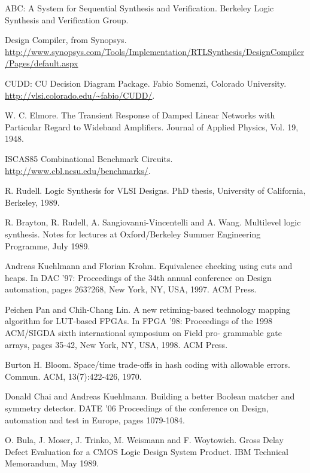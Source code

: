 \documentclass{tfg}
\begin{document}
\begin{thebibliography}{9}

ABC: A System for Sequential Synthesis and Verification. Berkeley Logic Synthesis and Verification Group.
 
Design Compiler, from Synopsys. \url{http://www.synopsys.com/Tools/Implementation/RTLSynthesis/DesignCompiler/Pages/default.aspx}

CUDD: CU Decision Diagram Package. Fabio Somenzi, Colorado University. \url{http://vlsi.colorado.edu/~fabio/CUDD/}.

W. C. Elmore. The Transient Response of Damped Linear Networks with Particular Regard to Wideband Amplifiers. Journal of Applied Physics, Vol. 19, 1948.

ISCAS85 Combinational Benchmark Circuits. \url{http://www.cbl.ncsu.edu/benchmarks/}.

R. Rudell. Logic Synthesis for VLSI Designs. PhD thesis, University of California, Berkeley, 1989.

R. Brayton, R. Rudell, A. Sangiovanni-Vincentelli and A. Wang. Multilevel logic synthesis. Notes for lectures at Oxford/Berkeley Summer Engineering Programme, July 1989.

Andreas Kuehlmann and Florian Krohm. Equivalence checking using
cuts and heaps. In DAC '97: Proceedings of the 34th annual conference
 on Design automation, pages 263?268, New York, NY, USA, 1997. ACM
  Press.

Peichen Pan and Chih-Chang Lin. A new retiming-based technology
mapping algorithm for LUT-based FPGAs. In FPGA '98: Proceedings
 of the 1998 ACM/SIGDA sixth international symposium on Field pro-
grammable gate arrays, pages 35-42, New York, NY, USA, 1998. ACM
 Press.
 
Burton H. Bloom. Space/time trade-offs in hash coding with allowable
errors. Commun. ACM, 13(7):422-426, 1970.

Donald Chai and Andreas Kuehlmann. Building a better Boolean matcher and symmetry detector. DATE '06 Proceedings of the conference on Design, automation and test in Europe, pages 1079-1084. 

O. Bula, J. Moser, J. Trinko, M. Weismann and F. Woytowich. Gross Delay Defect Evaluation for a CMOS Logic Design System Product. IBM Technical Memorandum, May 1989.


\end{thebibliography}
\end{document}
